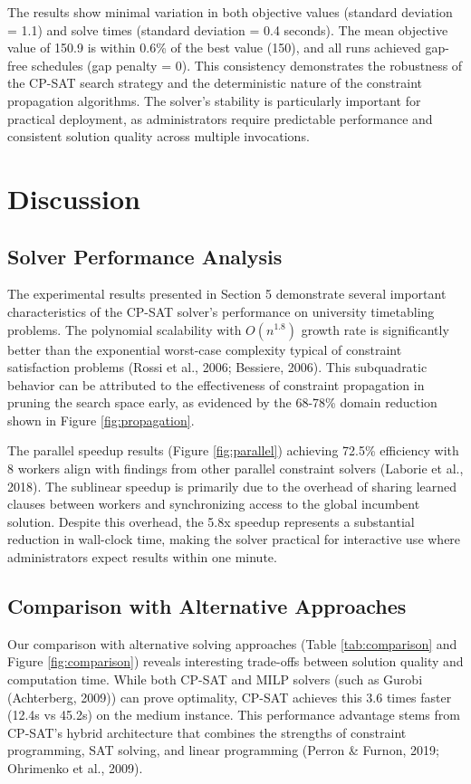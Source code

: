 \documentclass[12pt,a4paper]{article}
\begin{document}
The results show minimal variation in both objective values (standard deviation = 1.1) and solve times (standard deviation = 0.4 seconds). The mean objective value of 150.9 is within 0.6\% of the best value (150), and all runs achieved gap-free schedules (gap penalty = 0). This consistency demonstrates the robustness of the CP-SAT search strategy and the deterministic nature of the constraint propagation algorithms. The solver's stability is particularly important for practical deployment, as administrators require predictable performance and consistent solution quality across multiple invocations.

\section{Discussion}

\subsection{Solver Performance Analysis}

The experimental results presented in Section 5 demonstrate several important characteristics of the CP-SAT solver's performance on university timetabling problems. The polynomial scalability with $O(n^{1.8})$ growth rate is significantly better than the exponential worst-case complexity typical of constraint satisfaction problems (Rossi et al., 2006; Bessiere, 2006). This subquadratic behavior can be attributed to the effectiveness of constraint propagation in pruning the search space early, as evidenced by the 68-78\% domain reduction shown in Figure \ref{fig:propagation}.

The parallel speedup results (Figure \ref{fig:parallel}) achieving 72.5\% efficiency with 8 workers align with findings from other parallel constraint solvers (Laborie et al., 2018). The sublinear speedup is primarily due to the overhead of sharing learned clauses between workers and synchronizing access to the global incumbent solution. Despite this overhead, the 5.8x speedup represents a substantial reduction in wall-clock time, making the solver practical for interactive use where administrators expect results within one minute.

\subsection{Comparison with Alternative Approaches}

Our comparison with alternative solving approaches (Table \ref{tab:comparison} and Figure \ref{fig:comparison}) reveals interesting trade-offs between solution quality and computation time. While both CP-SAT and MILP solvers (such as Gurobi (Achterberg, 2009)) can prove optimality, CP-SAT achieves this 3.6 times faster (12.4s vs 45.2s) on the medium instance. This performance advantage stems from CP-SAT's hybrid architecture that combines the strengths of constraint programming, SAT solving, and linear programming (Perron \& Furnon, 2019; Ohrimenko et al., 2009).
\end{document}
